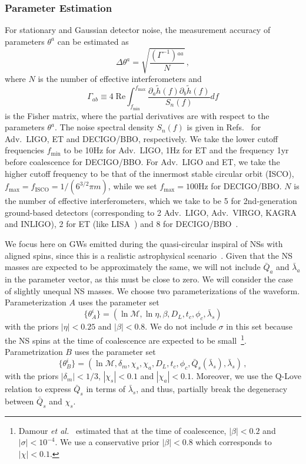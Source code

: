 \documentclass[aps,twocolumn,nofootinbib,showpacs,superscriptaddress,hyperref]{revtex4-1}
\newcommand\be{\begin{equation}}
\newcommand\ee{\end{equation}}
\newcommand{\mrm}{\mathrm}
\newcommand{\Qbar}{\bar{Q}}
\begin{document}
\subsubsection{Parameter Estimation}
\label{sec:parameter-estimation}

For stationary and Gaussian detector noise, the measurement accuracy of parameters $\theta^a$ can be estimated as
%
\be
\Delta \theta^a = \sqrt{\frac{(\Gamma^{-1}){}^{aa}}{N}}\,,
\ee
%
where $N$ is the number of effective interferometers and
%
\be
\Gamma_{ab} \equiv 4 \; \mrm{Re} \int^{f_\mrm{max}}_{f_\mrm{min}} \frac{\partial_a \tilde{h}(f) \partial_b \tilde{h}(f)}{S_n(f)} df
\ee
%
is the Fisher matrix, where the partial derivatives are with respect to the parameters $\theta^a$. The noise spectral density $S_n(f)$ is given in Refs.~\cite{cornish-PPE,mishra,yagi:brane} for Adv.~LIGO, ET and DECIGO/BBO, respectively. We take the lower cutoff frequencies $f_\mrm{min}$ to be 10Hz for Adv.~LIGO, 1Hz for ET and the frequency 1yr before coalescence for DECIGO/BBO. For Adv.~LIGO and ET, we take the higher cutoff frequency to be that of the innermost stable circular orbit (ISCO), $f_\mrm{max}=f_\mrm{ISCO}=1/(6^{3/2} \pi m)$, while we set $f_\mrm{max}=100$Hz for DECIGO/BBO. $N$ is the number of effective interferometers, which we take to be 5 for 2nd-generation ground-based detectors (corresponding to 2 Adv.~LIGO, Adv.~VIRGO, KAGRA and INLIGO), 2 for ET (like LISA~\cite{cutler1998}) and 8 for DECIGO/BBO~\cite{yagi:brane}.

We focus here on GWs emitted during the quasi-circular inspiral of NSs with aligned spins, since this is a realistic astrophysical scenario~\cite{kesden-berti}. Given that the NS masses are expected to be approximately the same, we will not include $\bar{Q}_a$ and $\bar{\lambda}_a$ in the parameter vector, as this must be close to zero. We will consider the case of slightly unequal NS masses. We choose two parameterizations of the waveform. Parameterization $A$ uses the parameter set~\cite{damour-nagar-villain}
%
\be
\{ \theta_A^i \} =  (\ln \mathcal{M}, \ln\eta, \beta, D_L, t_c, \phi_c, \bar{\lambda}_s)
\label{parameter-A}
\ee
%
with the priors $|\eta| < 0.25$ and $|\beta| < 0.8$. We do not include $\sigma$ in this set because the NS spins at the time of coalescence are expected to be small~\cite{bildsten-cutler}\footnote{Damour \textit{et al.}~\cite{damour-nagar-villain} estimated that at the time of coalescence, $|\beta| < 0.2$ and $|\sigma | < 10^{-4}$. We use a conservative prior $|\beta| < 0.8$ which corresponds to $|\chi|<0.1$.}.
Parametrization $B$ uses the parameter set
%
\be
\{ \theta_B^i \} =  (\ln \mathcal{M}, \delta_m, \chi_s, \chi_a, D_L, t_c, \phi_c, \bar{Q}_s(\bar{\lambda}_s), \bar{\lambda}_s)\,,
\label{parameter-B}
\ee
%
with the priors $|\delta_m| < 1/3$, $|\chi_s| < 0.1$ and $|\chi_a| < 0.1$. Moreover, we use the Q-Love relation to express $\Qbar_s$ in terms of $\bar{\lambda}_s$, and thus, partially break the degeneracy between $\Qbar_s$ and $\chi_s$.
\end{document}

